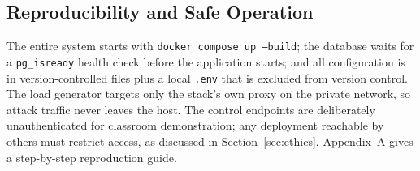 \subsection{Reproducibility and Safe Operation}
The entire system starts with \texttt{docker compose up --build}; the database waits
for a \texttt{pg\_isready} health check before the application starts; and all
configuration is in version-controlled files plus a local \texttt{.env} that is
excluded from version control. The load generator targets only the stack's own proxy
on the private network, so attack traffic never leaves the host. The control endpoints
are deliberately unauthenticated for classroom demonstration; any deployment reachable
by others must restrict access, as discussed in Section~\ref{sec:ethics}. Appendix~A
gives a step-by-step reproduction guide.
